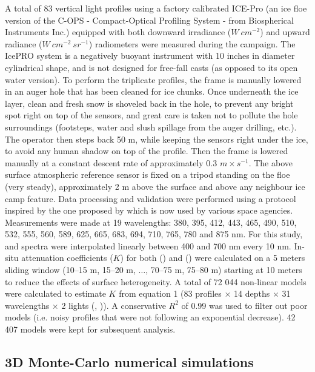 A total of 83 vertical light profiles using a factory calibrated  ICE-Pro (an ice floe version of the C-OPS - Compact-Optical Profiling System - from Biospherical Instruments Inc.) equipped with both downward irradiance \edz{} ($W~cm^{-2}$) and upward radiance \luz{} ($W~cm^{-2}~sr^{-1}$) radiometers were measured during the campaign. The IcePRO system is a negatively buoyant instrument with 10 inches in diameter cylindrical shape, and is not designed for free-fall casts (as opposed to its open water version). To perform the triplicate profiles, the frame is manually lowered in an auger hole that has been cleaned for ice chunks. Once underneath the ice layer, clean and fresh snow is shoveled back in the hole, to prevent any bright spot right on top of the sensors, and great care is taken not to pollute the hole surroundings (footsteps, water and slush spillage from the auger drilling, etc.). The operator then steps back 50 m, while keeping the sensors right under the ice, to avoid any human shadow on top of the profile. Then the frame is lowered manually at a constant descent rate of approximately 0.3 $m \times s^{-1}$. The above surface atmospheric reference sensor is fixed on a tripod standing on the floe (very steady), approximately 2 m above the surface and above any neighbour ice camp feature. Data processing and validation were performed using a protocol inspired by the one proposed by \citet{Smith1984} which is now used by various space agencies. Measurements were made at 19 wavelengths: 380, 395, 412, 443, 465, 490, 510, 532, 555, 560, 589, 625, 665, 683, 694, 710, 765, 780 and 875 nm. For this study, \ed{} and \lu{} spectra were interpolated linearly between 400 and 700 nm every 10 nm. In-situ attenuation coefficients ($K$) for both \ed{} (\ked{}) and \lu{} (\klu{}) were calculated on a 5 meters sliding window (10--15 m, 15--20 m, $\ldots$, 70--75 m, 75--80 m) starting at 10 meters to reduce the effects of surface heterogeneity. A total of 72 044 non-linear models were calculated to estimate $K$ from equation 1 (83 profiles $\times$ 14 depths $\times$ 31 wavelengths $\times$ 2 lights (\ed{}, \lu{})). A conservative $R^2$ of 0.99 was used to filter out poor models (i.e. noisy profiles that were not following an exponential decrease). 42 407 models were kept for subsequent analysis.

\subsection{3D Monte-Carlo numerical simulations}

